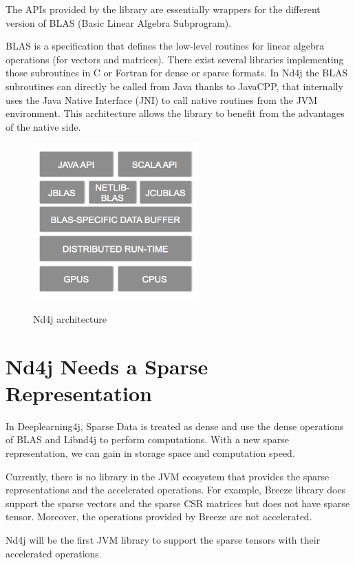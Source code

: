 The APIs provided by the library are essentially wrappers for the different version of BLAS (Basic Linear Algebra Subprogram). 

BLAS is a specification that defines the low-level routines for linear algebra operations (for vectors and matrices). There exist several libraries implementing those subroutines in C or Fortran for dense or sparse formats. In Nd4j the BLAS subroutines can directly be called from Java thanks to JavaCPP, that internally uses the Java Native Interface (JNI) to call native routines from the JVM environment. This architecture allows the library to benefit from the advantages of the native side.

\begin{figure}[h]
	\begin{center}
		\includegraphics[width=2.5in]{images/nd4j_architecture.png} 
		\label{fig:hierachy}
		\caption{Nd4j architecture}
	\end{center}
\end{figure}

\section{Nd4j Needs a Sparse Representation}

In Deeplearning4j, Sparse Data is treated as dense and use the dense operations of BLAS and Libnd4j to perform computations. With a new sparse representation, we can gain in storage space and computation speed.

Currently, there is no library in the JVM ecosystem that provides the sparse representations and the accelerated operations. For example, Breeze library \cite{breeze} does support the sparse vectors and the sparse CSR matrices but does not have sparse tensor. Moreover, the operations provided by Breeze are not accelerated. 

Nd4j will be the first JVM library to support the sparse tensors with their accelerated operations.
